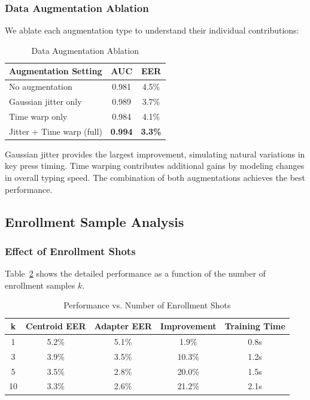 \documentclass{ieeeaccess}
\begin{document}
{\subsubsection{Data Augmentation Ablation}
We ablate each augmentation type to understand their individual contributions:

\begin{table}[h]
\caption{Data Augmentation Ablation}
\label{tab:aug_ablation}
\centering
\begin{tabular}{|l|c|c|}
\hline
\textbf{Augmentation Setting} & \textbf{AUC} & \textbf{EER} \\
\hline
No augmentation & 0.981 & 4.5\% \\
Gaussian jitter only & 0.989 & 3.7\% \\
Time warp only & 0.984 & 4.1\% \\
Jitter + Time warp (full) & \textbf{0.994} & \textbf{3.3\%} \\
\hline
\end{tabular}
\end{table}

Gaussian jitter provides the largest improvement, simulating natural variations in key press timing. Time warping contributes additional gains by modeling changes in overall typing speed. The combination of both augmentations achieves the best performance.

\subsection{Enrollment Sample Analysis}

\subsubsection{Effect of Enrollment Shots}
Table~\ref{tab:shots} shows the detailed performance as a function of the number of enrollment samples $k$.

\begin{table}[h]
\caption{Performance vs. Number of Enrollment Shots}
\label{tab:shots}
\centering
\begin{tabular}{|c|c|c|c|c|}
\hline
\textbf{k} & \textbf{Centroid EER} & \textbf{Adapter EER} & \textbf{Improvement} & \textbf{Training Time} \\
\hline
1 & 5.2\% & 5.1\% & 1.9\% & 0.8s \\
3 & 3.9\% & 3.5\% & 10.3\% & 1.2s \\
5 & 3.5\% & 2.8\% & 20.0\% & 1.5s \\
10 & 3.3\% & 2.6\% & 21.2\% & 2.1s \\
\hline
\end{tabular}
\end{table}

}
\end{document}
